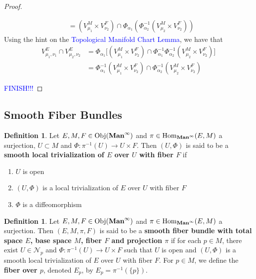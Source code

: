 \documentclass{book}
\theoremstyle{definition}
\newtheorem{defn}[definition]{Definition}
\newcommand{\al}{\alpha}
\newcommand{\MN}{\mathcal{N}}
\DeclareMathOperator{\Obj}{Obj}
\DeclareMathOperator{\Hom}{Hom}
\DeclareMathOperator*{\Maninf}{\text{\tbf{Man}}^{\infty}}
\DeclareMathOperator*{\0}{\mbf{0}}
\DeclareMathOperator*{\1}{\mbf{1}}
\newcommand{\tbf}[1]{\textbf{#1}}
\newcommand{\tcb}[1]{\textcolor{blue}{#1}}
\begin{document}
\begin{proof}
\begin{itemize}
\begin{align*}
				& = (V^M_{\mu_1} \times V^F_{\nu_2}) \cap \Phi_{\al_1} ( \Phi_{\al_2}^{-1}(V^M_{\mu_2} \times V^F_{\nu_2})) 
			\end{align*}  
			Using the hint on the \tcb{Topological Manifold Chart Lemma}, we have that
			\begin{align*}
				V^E_{\mu_1, \nu_1} \cap V^E_{\mu_2, \nu_2}
				& = \Phi_{\al_1} \bigg[ (V^M_{\mu_1} \times V^F_{\nu_2}) \cap \Phi_{\al_1}^{-1} \Phi_{\al_2}^{-1}(V^M_{\mu_2} \times V^F_{\nu_2}) \bigg] \\
				& = \Phi_{\al_1}^{-1}(V^M_{\mu_1} \times V^F_{\nu_2}) \cap \Phi_{\al_2}^{-1}(V^M_{\mu_2} \times V^F_{\nu_2}) 
			\end{align*}  
		
		\end{itemize}
		\tcb{FINISH!!!} 
	\end{proof}
	
















	\subsection{Smooth Fiber Bundles}
	
	\begin{defn}
		Let $E, M, F \in \Obj(\Maninf)$ and $\pi \in \Hom_{\Maninf}(E, M)$ a surjection, $U \subset M$ and $\Phi: \pi^{-1}(U) \rightarrow U \times F$. Then $(U, \Phi)$ is said to be a \tbf{smooth local trivialization of $E$ over $U$ with fiber $F$}  if 
		\begin{enumerate}
			\item $U$ is open
			\item $(U, \Phi)$ is a local trivialization of $E$ over $U$ with fiber $F$
			\item $\Phi$ is a diffeomorphism
		\end{enumerate}
	\end{defn}

	\begin{defn}
		Let $E,M, F \in \Obj(\Maninf)$ and $\pi \in \Hom_{\Maninf}(E, M)$ a surjection. Then $(E, M, \pi, F)$ is said to be a \tbf{smooth fiber bundle with total space $E$, base space $M$, fiber $F$ and projection $\pi$} if for each $p \in M$, there exist $U \in \MN_p$ and $\Phi: \pi^{-1}(U) \rightarrow U \times F$ such that $U$ is open and $(U, \Phi)$ is a smooth local trivialization of $E$ over $U$ with fiber $F$. For $p \in M$, we define the \tbf{fiber over $p$}, denoted $E_p$, by $E_p = \pi^{-1}(\{p\})$.
	\end{defn}
\end{document}
